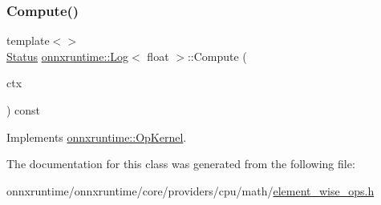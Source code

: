 \subsubsection{\texorpdfstring{Compute()}{Compute()}\hspace{0.1cm}{\footnotesize\ttfamily [2/2]}}
{\footnotesize\ttfamily template$<$$>$ \\
\mbox{\hyperlink{classonnxruntime_1_1common_1_1Status}{Status}} \mbox{\hyperlink{classonnxruntime_1_1Log}{onnxruntime\+::\+Log}}$<$ float $>$\+::Compute (\begin{DoxyParamCaption}\item[{\mbox{\hyperlink{classonnxruntime_1_1OpKernelContext}{Op\+Kernel\+Context}} $\ast$}]{ctx }\end{DoxyParamCaption}) const\hspace{0.3cm}{\ttfamily [virtual]}}



Implements \mbox{\hyperlink{classonnxruntime_1_1OpKernel_a9eca8656a78b1b3ab9d3351a12798650}{onnxruntime\+::\+Op\+Kernel}}.



The documentation for this class was generated from the following file\+:\begin{DoxyCompactItemize}
\item 
onnxruntime/onnxruntime/core/providers/cpu/math/\mbox{\hyperlink{element__wise__ops_8h}{element\+\_\+wise\+\_\+ops.\+h}}\end{DoxyCompactItemize}
